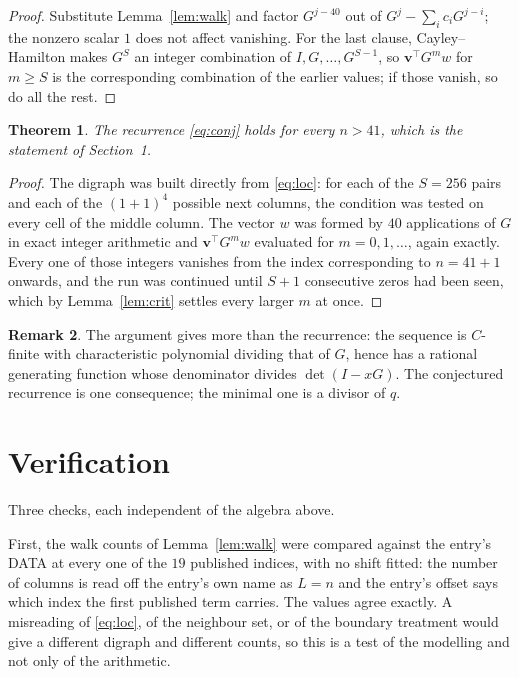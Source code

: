 \documentclass[11pt,a4paper]{article}
\theoremstyle{plain}
\newtheorem{theorem}{Theorem}
\theoremstyle{definition}
\newtheorem{remark}[theorem]{Remark}
\begin{document}
\begin{proof}
Substitute Lemma~\ref{lem:walk} and factor $G^{j-40}$ out of
$G^{j}-\sum_ic_iG^{j-i}$; the nonzero scalar $1$ does not affect
vanishing. For the last clause, Cayley--Hamilton makes $G^{S}$ an integer combination of
$I,G,\dots,G^{S-1}$, so $\mathbf{v}^{\!\top}G^{m}w$ for $m\ge S$ is the corresponding
combination of the earlier values; if those vanish, so do all the rest.
\end{proof}

\begin{theorem}
The recurrence \eqref{eq:conj} holds for every $n>41$, which is the statement of
Section~1.
\end{theorem}

\begin{proof}
The digraph was built directly from \eqref{eq:loc}: for each of the $S=256$ pairs and each
of the $(1+1)^{4}$ possible next columns, the condition was tested on every cell of
the middle column. The vector $w$ was formed by $40$ applications of $G$ in exact integer
arithmetic and $\mathbf{v}^{\!\top}G^{m}w$ evaluated for $m=0,1,\dots$, again exactly.
Every one of those integers vanishes from the index corresponding to $n=41+1$ onwards,
and the run was continued until $S+1$ consecutive zeros had been seen, which by
Lemma~\ref{lem:crit} settles every larger $m$ at once.
\end{proof}

\begin{remark}
The argument gives more than the recurrence: the sequence is $C$-finite with characteristic
polynomial dividing that of $G$, hence has a rational generating function whose denominator
divides $\det(I-xG)$. The conjectured recurrence is one consequence; the minimal one is a
divisor of $q$.
\end{remark}

\section{Verification}

Three checks, each independent of the algebra above.

First, the walk counts of Lemma~\ref{lem:walk} were compared against the entry's DATA at
every one of the $19$ published indices, with no shift fitted: the number of columns is
read off the entry's own name as $L=n$ and the entry's offset says which index the first
published term carries. The values agree exactly. A misreading of \eqref{eq:loc}, of the
neighbour set, or of the boundary treatment would give a different digraph and different
counts, so this is a test of the modelling and not only of the arithmetic.
\end{document}
